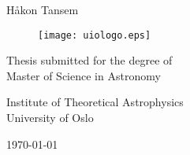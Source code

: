 \begin{titlepage}
\begin{center}

\bfseries
\huge%
\mintittel

\vspace{2cm}
\LARGE
Håkon Tansem


\vspace{1cm}
\begin{figure}[h]
\centering
\texttt{[image: uiologo.eps]}
\centering
\end{figure}
\vspace{3cm}
\Large
Thesis submitted for the degree of \\
Master of Science in Astronomy%

\vspace{0.4cm}
\large
Institute of Theoretical Astrophysics\\
University of Oslo

\vspace{0.8cm}
\today

\end{center}
\normalfont

\end{titlepage}
